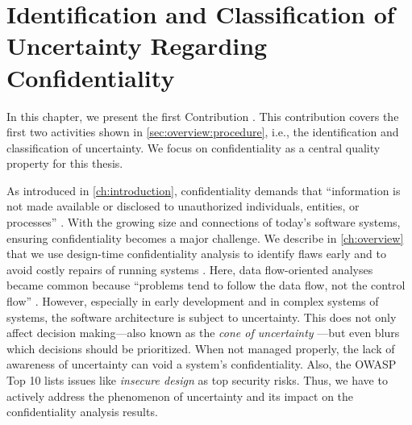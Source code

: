 \chapter{Identification and Classification of Uncertainty Regarding Confidentiality}%
\label{ch:classification}%
 

In this chapter, we present the first Contribution .
This contribution covers the first two activities shown in \autoref{sec:overview:procedure}, i.e., the identification and classification of uncertainty.
We focus on confidentiality as a central quality property for this thesis.

As introduced in \autoref{ch:introduction}, confidentiality demands that \enquote{information is not made available or disclosed to unauthorized individuals, entities, or processes} \cite{international_organization_for_standardization_isoiec_2018}.
With the growing size and connections of today's software systems, ensuring confidentiality becomes a major challenge. 
We describe in \autoref{ch:overview} that we use design-time confidentiality analysis \cite{seifermann_detecting_2022,tuma_flaws_2019} to identify flaws early and to avoid costly repairs of running systems \cite{boehm_software_2001}.
Here, data flow-oriented analyses became common because \enquote{problems tend to follow the data flow, not the control flow} \cite{shostack_threat_2014}.
However, especially in early development and in complex systems of systems, the software architecture is subject to uncertainty.
This does not only affect decision making---also known as the \emph{cone of uncertainty} \cite{mcconnell_software_1998}---but even blurs which decisions should be prioritized.
When not managed properly, the lack of awareness of uncertainty can void a system's confidentiality.
Also, the \ac{OWASP} Top 10 \cite{OWASPTop10} lists issues like \emph{insecure design} as top security risks.
Thus, we have to actively address the phenomenon of uncertainty and its impact on the confidentiality analysis results.

